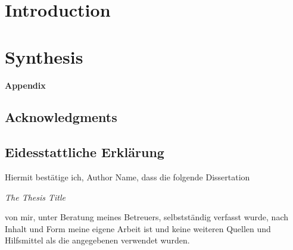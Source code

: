 \documentclass[12pt, openany]{book}
\def\MYTITLE{The Thesis Title}
\def\MYAUTHOR{Author Name}
\begin{document}
\setcounter{chapter}{-1}
\chapter[Introduction]{\centering Introduction\\}
\renewcommand{\chaptername}{Chapter~}
\renewcommand{\headchapter}{\thechapter}


\newpage


\chapter[Synthesis]{\centering Synthesis\\}
\renewcommand{\chaptername}{}
\renewcommand{\headchapter}{Synthesis}


\newpage
\renewcommand{\chaptername}{}
\mystyletwo
\renewcommand{\headchapter}{Lists}
{\Huge\normalfont\bfseries\textcolor{clrt1}{Appendix}}
\listoffigures
{}
\listofsupplFigures
{}
\listoftables
{}
\listofsupplTables

\newpage
\mystyleone
\renewcommand{\headchapter}{Author Contributions}


\newpage
\renewcommand{\headchapter}{CV}


\newpage
\renewcommand{\headchapter}{Acknowledgments}
\section*{Acknowledgments}


\newpage
\renewcommand{\headchapter}{~}
\section*{Eidesstattliche Erklärung}
Hiermit bestätige ich, \MYAUTHOR, dass die folgende Dissertation\vspace{1em}

\textit{\MYTITLE}\vspace{1em}

von mir, unter Beratung meines Betreuers, selbstständig verfasst wurde, nach Inhalt und Form meine eigene Arbeit ist und keine weiteren Quellen und Hilfsmittel als die angegebenen verwendet wurden.
\end{document}
